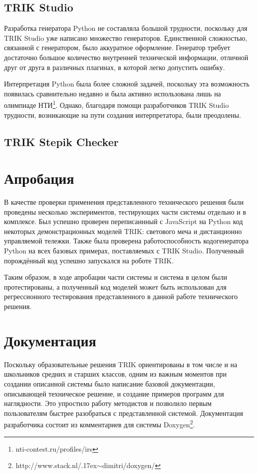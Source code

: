 \documentclass[14pt]{matmex-diploma-custom}
\begin{document}
\subsection{TRIK Studio}
Разработка генератора Python не составляла большой трудности, поскольку для TRIK Studio уже написано множество генераторов. Единственной сложностью, связанной с генератором, было аккуратное оформление. Генератор требует достаточно большое количество внутренней технической информации, отличной друг от друга в различных плагинах, в которой легко допустить ошибку.

Интерпретация Python была более сложной задачей, поскольку эта возможность появилась сравнительно недавно и была активно использована лишь на олимпиаде НТИ\footnote{nti-contest.ru/profiles/irs}. Однако, благодаря помощи разработчиков TRIK Studio трудности, возникающие на пути создания интерпретатора, были преодолены.

\subsection{TRIK Stepik Checker}


\section{Апробация}
В качестве проверки применения представленного технического решения были проведены несколько экспериментов, тестирующих части системы отдельно и в комплексе. Был успешно проверен переписаннный с JavaScript на Python код некоторых демонстрационных моделей TRIK: светового меча и дистанционно управляемой тележки. Также была проверена работоспособность кодогенератора Python на всех базовых примерах, поставляемых с TRIK Studio. Полученный порождённый код успешно запускался на роботе TRIK. 

Таким образом, в ходе апробации части системы и система в целом были протестированы, а полученный код моделей может быть использован для регрессионного тестирования представленного в данной работе технического решения.

\section{Документация}
Поскольку образовательные решения TRIK ориентированы в том числе и на школьников средних и старших классов, одним из важным моментов при создании описанной системы было написание базовой документации, описывающей техническое решение, и создание примеров программ для наглядности. Это упростило работу методистов и позволило первым пользователям быстрее разобраться с представленной системой. Документация разработчика состоит из комментариев для системы Doxygen\footnote{http://www.stack.nl/{\raise.17ex\hbox{$\scriptstyle\sim$}}dimitri/doxygen/}.
\end{document}
